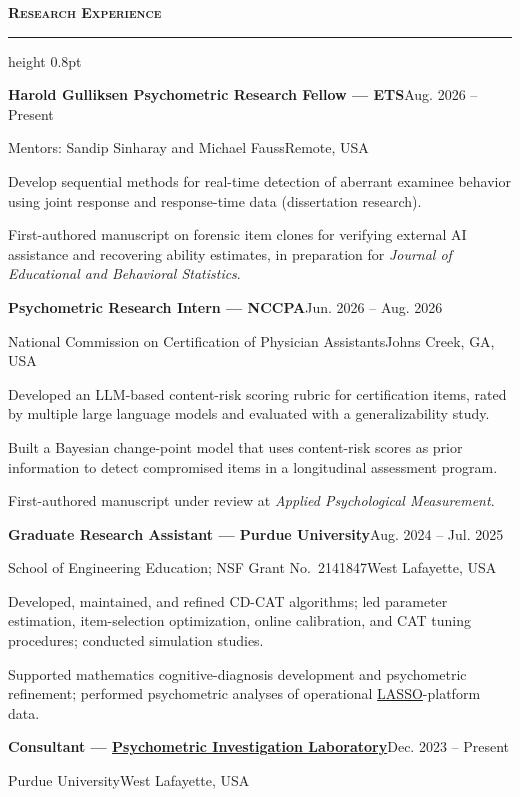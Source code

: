 \documentclass[10.5pt,letterpaper]{article}
\renewcommand{\section}[1]{%
  \needspace{3\baselineskip}\vspace{12pt}\par
  {\fontsize{13.5}{16}\selectfont\bfseries\scshape\color{accent}#1}\hspace{6pt}%
  {\color{accent}\leaders\hrule height 0.8pt\hfill\kern0pt}\par\vspace{6pt}}
\newcommand{\entry}[4]{%
  \needspace{2\baselineskip}%
  {\color{textdark}\textbf{#1}}\hfill{#2}\par
  {#3}\hfill{#4}\par\vspace{3pt}}
\begin{document}
\section{Research Experience}
\entry{Harold Gulliksen Psychometric Research Fellow --- ETS}{Aug. 2026 -- Present}{Mentors: Sandip Sinharay and Michael Fauss}{Remote, USA}
\begin{cvbullets}
  \item Develop sequential methods for real-time detection of aberrant examinee behavior using joint response and response-time data (dissertation research).
  \item First-authored manuscript on forensic item clones for verifying external AI assistance and recovering ability estimates, in preparation for \textit{Journal of Educational and Behavioral Statistics}.
\end{cvbullets}
\entry{Psychometric Research Intern --- NCCPA}{Jun. 2026 -- Aug. 2026}{National Commission on Certification of Physician Assistants}{Johns Creek, GA, USA}
\begin{cvbullets}
  \item Developed an LLM-based content-risk scoring rubric for certification items, rated by multiple large language models and evaluated with a generalizability study.
  \item Built a Bayesian change-point model that uses content-risk scores as prior information to detect compromised items in a longitudinal assessment program.
  \item First-authored manuscript under review at \textit{Applied Psychological Measurement}.
\end{cvbullets}
\entry{Graduate Research Assistant --- Purdue University}{Aug. 2024 -- Jul. 2025}{School of Engineering Education; NSF Grant No.\ 2141847}{West Lafayette, USA}
\begin{cvbullets}
  \item Developed, maintained, and refined CD-CAT algorithms; led parameter estimation, item-selection optimization, online calibration, and CAT tuning procedures; conducted simulation studies.
  \item Supported mathematics cognitive-diagnosis development and psychometric refinement; performed psychometric analyses of operational \href{https://lassoeducation.org}{LASSO}-platform data.
\end{cvbullets}
\entry{Consultant --- \href{https://education.purdue.edu/research/centers-and-institutes/psychometric-investigation-lab/}{Psychometric Investigation Laboratory}}{Dec. 2023 -- Present}{Purdue University}{West Lafayette, USA}
\end{document}
